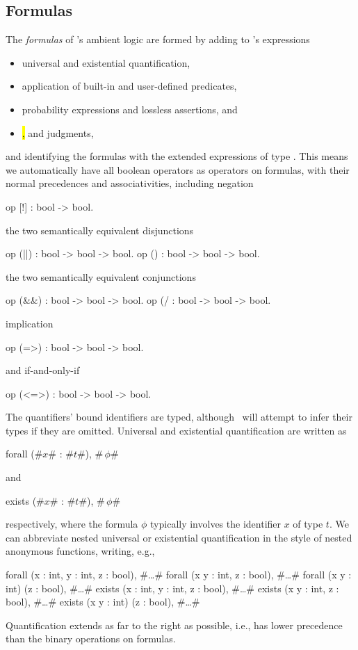 \subsection{Formulas}

The \emph{formulas} of \EasyCrypt's ambient logic are formed by
adding to \EasyCrypt's expressions
\begin{itemize}
\item universal and existential quantification,

\item application of built-in and user-defined predicates,

\item probability expressions and lossless assertions, and

\item \hl, \phl and \prhl judgments,
\end{itemize}
and identifying the formulas with the extended expressions of type
.
This means we automatically have all boolean operators as operators on
formulas, with their normal precedences and associativities, including
negation
\begin{easycrypt}{}{}
op [!] : bool -> bool.
\end{easycrypt}
the two semantically equivalent disjunctions
\begin{easycrypt}{}{}
op (||) : bool -> bool -> bool.
op (\/) : bool -> bool -> bool.
\end{easycrypt}
the two semantically equivalent conjunctions
\begin{easycrypt}{}{}
op (&&) : bool -> bool -> bool.
op (/\) : bool -> bool -> bool.
\end{easycrypt}
implication
\begin{easycrypt}{}{}
op (=>) : bool -> bool -> bool.
\end{easycrypt}
and if-and-only-if
\begin{easycrypt}{}{}
op (<=>) : bool -> bool -> bool.
\end{easycrypt}

The quantifiers' bound identifiers are typed, although \EasyCrypt\
will attempt to infer their types if they are omitted. Universal and
existential quantification are written as
\begin{easycrypt}{}{}
forall (#$x$# : #$t$#), #$\,\phi$#
\end{easycrypt}
and
\begin{easycrypt}{}{}
exists (#$x$# : #$t$#), #$\,\phi$#
\end{easycrypt}
respectively, where the formula $\phi$ typically involves the
identifier $x$ of type $t$. We can abbreviate nested universal or
existential quantification in the style of nested anonymous functions,
writing, e.g.,
\begin{easycrypt}{}{}
forall (x : int, y : int, z : bool), #\ldots#
forall (x y : int, z : bool), #\ldots#
forall (x y : int) (z : bool), #\ldots#
exists (x : int, y : int, z : bool), #\ldots#
exists (x y : int, z : bool), #\ldots#
exists (x y : int) (z : bool), #\ldots#
\end{easycrypt}
Quantification extends as far to the right as possible, i.e.,
has lower precedence than the binary operations on formulas.

